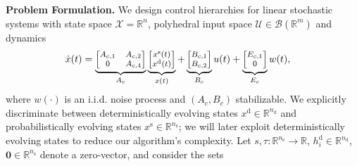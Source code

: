 \documentclass{IEEEtran}
\begin{document}
\textbf{Problem Formulation.} 
We design control hierarchies for linear stochastic systems with state space $\mathcal{X}=\mathbb{R}^n$, polyhedral input space $\mathcal{U}\in\mathcal{B}(\mathbb{R}^m)$ and dynamics
\begin{align}
    \label{eq_ct_lti_system}
\dot x(t) &= \underbrace{\footnotesize\begin{bmatrix}
        A_{c,1} & A_{c,2} \\ 0 & A_{c,4}
    \end{bmatrix}}_{A_c}\underbrace{\footnotesize\begin{bmatrix}
        x^{\text{s}}(t) \\ x^{\text{d}}(t)
    \end{bmatrix}}_{x(t)} +\underbrace{\footnotesize\begin{bmatrix}
        B_{c,1} \\ B_{c,2}
    \end{bmatrix}}_{B_c}u(t)+\underbrace{\footnotesize\begin{bmatrix}
        E_{c,1} \\ 0
    \end{bmatrix}}_{E_c}w(t),
\end{align}
where $w(\cdot)$ is an i.i.d. noise process and $(A_c,B_c)$ stabilizable. We explicitly discriminate between deterministically evolving states $x^{\text{d}}\in\mathbb{R}^{n_{\text{d}}}$ and probabilistically evolving states $x^{\text{s}}\in\mathbb{R}^{n_{\text{s}}}$; we will later exploit deterministically evolving states to reduce our algorithm's complexity. Let $s,\tau:\mathbb{R}^{n_{\text{s}}}\rightarrow\mathbb{R}$, $h_i^{\text{d}}\in\mathbb{R}^{n_{\text{d}}}$, $\mathbf{0}\in\mathbb{R}^{n_{\text{s}}}$ denote a zero-vector, and consider the sets
\end{document}
